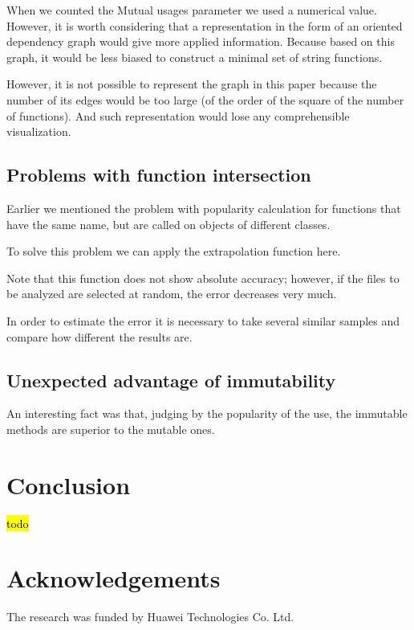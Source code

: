 \documentclass[anonymous,sigplan,review,11pt,nonacm,natbib=false]{acmart}
\begin{document}
    When we counted the Mutual usages parameter we used a numerical value. However, it is worth considering that a representation in the form of an oriented dependency graph would give more applied information. Because based on this graph, it would be less biased to construct a minimal set of string functions.

    However, it is not possible to represent the graph in this paper because the number of its edges would be too large (of the order of the square of the number of functions). And such representation would lose any comprehensible visualization.

    \subsection{Problems with function intersection}

    Earlier we mentioned the problem with popularity calculation for functions that have the same name, but are called on objects of different classes.

    To solve this problem we can apply the extrapolation function here.

    Note that this function does not show absolute accuracy; however, if the files to be analyzed are selected at random, the error decreases very much.

    In order to estimate the error it is necessary to take several similar samples and compare how different the results are.

    \subsection{Unexpected advantage of immutability}

    An interesting fact was that, judging by the popularity of the use, the immutable methods are superior to the mutable ones.

    \section{Conclusion}\label{sec:conclusion}

    \hl{todo}

    \section{Acknowledgements}

    The research was funded by Huawei Technologies Co. Ltd.
\end{document}
